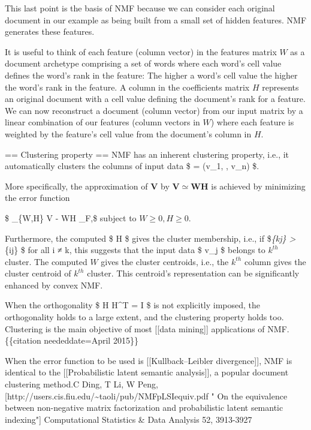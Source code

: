 \documentclass[11pt]{article}
\begin{document}
This last point is the basis of NMF because we can consider each
original document in our example as being built from a small set of
hidden features. NMF generates these features.

It is useful to think of each feature (column vector) in the features
matrix \(W\) as a document archetype comprising a set of words where
each word's cell value defines the word's rank in the feature: The
higher a word's cell value the higher the word's rank in the feature. A
column in the coefficients matrix \(H\) represents an original document
with a cell value defining the document's rank for a feature. We can now
reconstruct a document (column vector) from our input matrix by a linear
combination of our features (column vectors in \(W\)) where each feature
is weighted by the feature's cell value from the document's column in
\(H\).

== Clustering property == NMF has an inherent clustering property, i.e.,
it automatically clusters the columns of input data \$ =
(v\_1, \cdots, v\_n) \$.

More specifically, the approximation of \(\mathbf{V}\) by
\(\mathbf{V} \simeq \mathbf{W}\mathbf{H}\) is achieved by minimizing the
error function

\$ \min\_\{W,H\} \textbar{}\textbar{} V - WH \textbar{}\textbar{}\_F,\$
subject to \(W \geq 0, H \geq 0.\)

Furthermore, the computed \$ H \$ gives the cluster membership, i.e., if
\$\emph{\{kj\} \textgreater{} }\{ij\} \$ for all i ≠
k, this suggests that the input data \$ v\_j \$ belongs to \(k^{th}\)
cluster. The computed \(W\) gives the cluster centroids, i.e., the
\(k^{th}\) column gives the cluster centroid of \(k^{th}\) cluster. This
centroid's representation can be significantly enhanced by convex NMF.

When the orthogonality \$ H H\^{}T = I \$ is not explicitly imposed, the
orthogonality holds to a large extent, and the clustering property holds
too. Clustering is the main objective of most {[}{[}data mining{]}{]}
applications of NMF.\{\{citation needed\textbar{}date=April 2015\}\}

When the error function to be used is {[}{[}Kullback--Leibler
divergence{]}{]}, NMF is identical to the {[}{[}Probabilistic latent
semantic analysis{]}{]}, a popular document clustering method.C Ding, T
Li, W Peng,
{[}http://users.cis.fiu.edu/\textasciitilde{}taoli/pub/NMFpLSIequiv.pdf
" On the equivalence between non-negative matrix factorization and
probabilistic latent semantic indexing"{]} Computational Statistics \&
Data Analysis 52, 3913-3927
\end{document}
